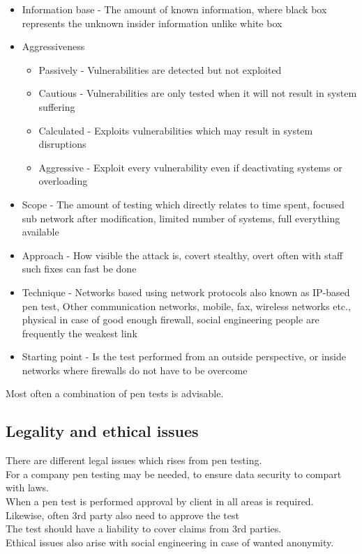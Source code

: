 \documentclass[12pt, a4paper]{article}
\begin{document}
			\begin{itemize}
				\item Information base - The amount of known information, where black box represents the unknown insider information unlike white box
				\item Aggressiveness
				\begin{itemize}
					\item Passively - Vulnerabilities are detected but not exploited
					\item Cautious - Vulnerabilities are only tested when it will not result in system suffering
					\item Calculated - Exploits vulnerabilities which may result in system disruptions
					\item Aggressive - Exploit every vulnerability even if deactivating systems or overloading
				\end{itemize}
				\item Scope - The amount of testing which directly relates to time spent, focused sub network after modification, limited number of systems, full everything available
				\item Approach - How visible the attack is, covert stealthy, overt often with staff such fixes can fast be done
				\item Technique - Networks based using network protocols also known as IP-based pen test, Other communication networks, mobile, fax, wireless networks etc., physical in case of good enough firewall, social engineering people are frequently the weakest link
				\item Starting point - Is the test performed from an outside perspective, or inside networks where firewalls do not have to be overcome
			\end{itemize}
			Most often a combination of pen tests is advisable.
		\subsection{Legality and ethical issues}
			There are different legal issues which rises from pen testing.\\
			For a company pen testing may be needed, to ensure data security to compart with laws.\\
			When a pen test is performed approval by client in all areas is required.\\
			Likewise, often 3rd party also need to approve the test\\
			The test should have a liability to cover claims from 3rd parties.\\
			Ethical issues also arise with social engineering in case of wanted anonymity.	
\end{document}
